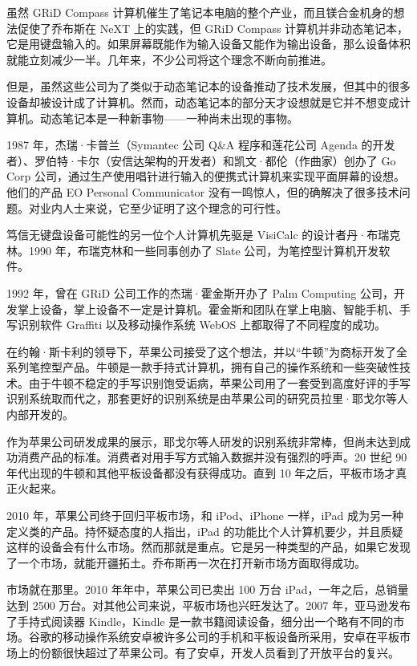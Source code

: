 \documentclass[12pt,UTF8]{ctexbook}
\begin{document}
虽然 GRiD Compass 计算机催生了笔记本电脑的整个产业，而且镁合金机身的想法促使了乔布斯在 NeXT 上的实践，但 GRiD Compass 计算机并非动态笔记本，它是用键盘输入的。如果屏幕既能作为输入设备又能作为输出设备，那么设备体积就能立刻减少一半。几年来，不少公司将这个理念不断向前推进。

但是，虽然这些公司为了类似于动态笔记本的设备推动了技术发展，但其中的很多设备却被设计成了计算机。然而，动态笔记本的部分天才设想就是它并不想变成计算机。动态笔记本是一种新事物——一种尚未出现的事物。

1987 年，杰瑞·卡普兰（Symantec 公司 Q\&A 程序和莲花公司 Agenda 的开发者）、罗伯特·卡尔（安信达架构的开发者）和凯文·都伦（作曲家）创办了 Go Corp 公司，通过生产使用唱针进行输入的便携式计算机来实现平面屏幕的设想。他们的产品 EO Personal Communicator 没有一鸣惊人，但的确解决了很多技术问题。对业内人士来说，它至少证明了这个理念的可行性。

笃信无键盘设备可能性的另一位个人计算机先驱是 VisiCalc 的设计者丹·布瑞克林。1990 年，布瑞克林和一些同事创办了 Slate 公司，为笔控型计算机开发软件。

1992 年，曾在 GRiD 公司工作的杰瑞·霍金斯开办了 Palm Computing 公司，开发掌上设备，掌上设备不一定是计算机。霍金斯和团队在掌上电脑、智能手机、手写识别软件 Graffiti 以及移动操作系统 WebOS 上都取得了不同程度的成功。

在约翰·斯卡利的领导下，苹果公司接受了这个想法，并以“牛顿”为商标开发了全系列笔控型产品。牛顿是一款手持式计算机，拥有自己的操作系统和一些突破性技术。由于牛顿不稳定的手写识别饱受诟病，苹果公司用了一套受到高度好评的手写识别系统取而代之，那套更好的识别系统是由苹果公司的研究员拉里·耶戈尔等人内部开发的。

作为苹果公司研发成果的展示，耶戈尔等人研发的识别系统非常棒，但尚未达到成功消费产品的标准。消费者对用手写方式输入数据并没有强烈的呼声。20 世纪 90 年代出现的牛顿和其他平板设备都没有获得成功。直到 10 年之后，平板市场才真正火起来。

2010 年，苹果公司终于回归平板市场，和 iPod、iPhone 一样，iPad 成为另一种定义类的产品。持怀疑态度的人指出，iPad 的功能比个人计算机要少，并且质疑这样的设备会有什么市场。然而那就是重点。它是另一种类型的产品，如果它发现了一个市场，就能开疆拓土。乔布斯再一次在打开新市场方面取得成功。

市场就在那里。2010 年年中，苹果公司已卖出 100 万台 iPad，一年之后，总销量达到 2500 万台。对其他公司来说，平板市场也兴旺发达了。2007 年，亚马逊发布了手持式阅读器 Kindle，Kindle 是一款书籍阅读设备，细分出一个略有不同的市场。谷歌的移动操作系统安卓被许多公司的手机和平板设备所采用，安卓在平板市场上的份额很快超过了苹果公司。有了安卓，开发人员看到了开放平台的复兴。
\end{document}
